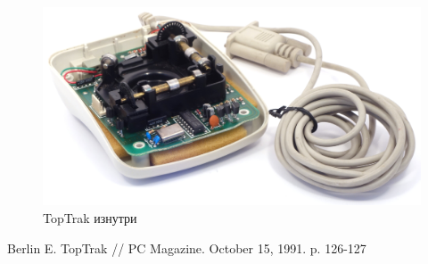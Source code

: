 \documentclass[11pt, a4paper]{article}
\begin{document}
\begin{figure}[h]
    \centering
    \includegraphics[scale=0.7]{1990_kraft_toptrack/inside_60.jpg}
    \caption{TopTrak изнутри}
    \label{fig:TopTrakInside}
\end{figure}

\begin{thebibliography}{9}
 Berlin E. TopTrak // PC Magazine. October 15, 1991. p. 126-127
\end{thebibliography}
\end{document}
